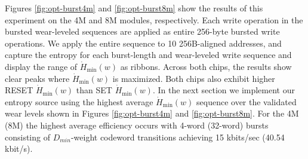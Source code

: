 Figures \ref{fig:opt-burst4m} and \ref{fig:opt-burst8m} show the results of this experiment on the 4M and 8M modules, respectively. Each write operation in the bursted wear-leveled sequences are applied as entire 256-byte bursted write operations. We apply the entire sequence to 10 256B-aligned addresses, and capture the entropy for each burst-length and wear-leveled write sequence and display the range of $\dot{H}_{\min}(w)$ as ribbons. Across both chips, the results show clear peaks where $\dot{H}_{\min}(w)$ is maximized. Both chips also exhibit higher RESET $\dot{H}_{\min}(w)$ than SET $\dot{H}_{\min}(w)$.
In the next section we implement our entropy source using the highest average $\dot{H}_{\min}(w)$ sequence over the validated wear levels shown in Figures \ref{fig:opt-burst4m} and \ref{fig:opt-burst8m}. For the 4M (8M) the highest average efficiency occurs with 4-word (32-word) bursts consisting of $D_{min}$-weight codeword transitions achieving 15 kbits/sec (40.54 kbit/s).